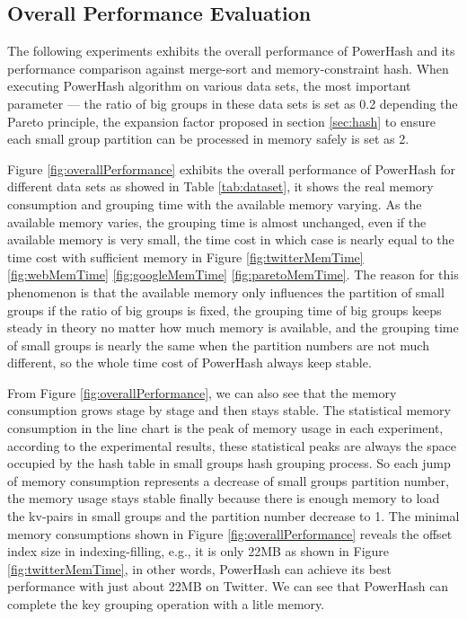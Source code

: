 \subsection{Overall Performance Evaluation}

The following experiments exhibits the overall performance of PowerHash and its performance comparison against merge-sort and memory-constraint hash. When executing PowerHash algorithm on various data sets, the most important parameter --- the ratio of big groups in these data sets is set as 0.2 depending the Pareto principle, the expansion factor proposed in section \ref{sec:hash} to ensure each small group partition can be processed in memory safely is set as 2. 

Figure \ref{fig:overallPerformance} exhibits the overall performance of PowerHash for different data sets as showed in Table \ref{tab:dataset}, it shows the real memory consumption and grouping time with the available memory varying. As the available memory varies, the grouping time is almost unchanged, even if the available memory is very small, the time cost in which case is nearly equal to the time cost with sufficient memory in Figure \ref{fig:twitterMemTime} \ref{fig:webMemTime} \ref{fig:googleMemTime} \ref{fig:paretoMemTime}. The reason for this phenomenon is that the available memory only influences the partition of small groups if the ratio of big groups is fixed, the grouping time of big groups keeps steady in theory no matter how much memory is available, and the grouping time of small groups is nearly the same when the partition numbers are not much different, so the whole time cost of PowerHash always keep stable. 

From Figure \ref{fig:overallPerformance}, we can also see that the memory consumption grows stage by stage and then stays stable. The statistical memory consumption in the line chart is the peak of memory usage in each experiment, according to the experimental results, these statistical peaks are always the space occupied by the hash table in small groups hash grouping process. So each jump of memory consumption represents a decrease of small groups partition number, the memory usage stays stable finally because there is enough memory to load the kv-pairs in small groups and the partition number decrease to 1. The minimal memory consumptions shown in Figure \ref{fig:overallPerformance} reveals the offset index size in indexing-filling, e.g., it is only 22MB as shown in Figure \ref{fig:twitterMemTime}, in other words, PowerHash can achieve its best performance with just about 22MB on Twitter. We can see that PowerHash can complete the key grouping operation with a litle memory.
 

